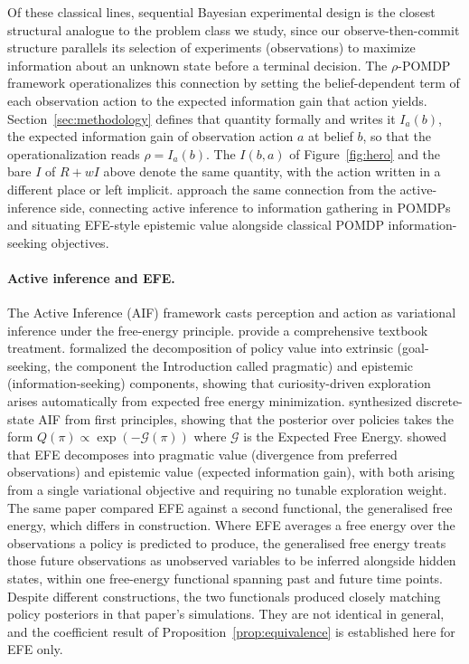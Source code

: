 Of these classical lines, sequential Bayesian experimental design is the closest structural analogue to the problem class we study, since our observe-then-commit structure parallels its selection of experiments (observations) to maximize information about an unknown state before a terminal decision. The $\rho$-POMDP framework operationalizes this connection by setting the belief-dependent term of each observation action to the expected information gain that action yields. Section~\ref{sec:methodology} defines that quantity formally and writes it $I_a(b)$, the expected information gain of observation action $a$ at belief $b$, so that the operationalization reads $\rho = I_a(b)$. The $I(b,a)$ of Figure~\ref{fig:hero} and the bare $I$ of $R + wI$ above denote the same quantity, with the action written in a different place or left implicit. \citet{walraven2024} approach the same connection from the active-inference side, connecting active inference to information gathering in POMDPs and situating EFE-style epistemic value alongside classical POMDP information-seeking objectives.

\paragraph{Active inference and EFE.}
The Active Inference (AIF) framework \citep{friston2010} casts perception and action as variational inference under the free-energy principle. \citet{parr2022} provide a comprehensive textbook treatment. \citet{friston2015} formalized the decomposition of policy value into extrinsic (goal-seeking, the component the Introduction called pragmatic) and epistemic (information-seeking) components, showing that curiosity-driven exploration arises automatically from expected free energy minimization. \citet{dacosta2020} synthesized discrete-state AIF from first principles, showing that the posterior over policies takes the form $Q(\pi) \propto \exp(-\mathcal{G}(\pi))$ where $\mathcal{G}$ is the Expected Free Energy. \citet{parr2019} showed that EFE decomposes into pragmatic value (divergence from preferred observations) and epistemic value (expected information gain), with both arising from a single variational objective and requiring no tunable exploration weight. The same paper compared EFE against a second functional, the generalised free energy, which differs in construction. Where EFE averages a free energy over the observations a policy is predicted to produce, the generalised free energy treats those future observations as unobserved variables to be inferred alongside hidden states, within one free-energy functional spanning past and future time points. Despite different constructions, the two functionals produced closely matching policy posteriors in that paper's simulations. They are not identical in general, and the coefficient result of Proposition~\ref{prop:equivalence} is established here for EFE only.

